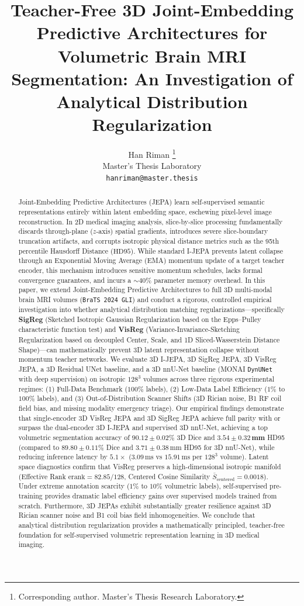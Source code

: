 \documentclass{article}
\title{Teacher-Free 3D Joint-Embedding Predictive Architectures for Volumetric Brain MRI Segmentation: An Investigation of Analytical Distribution Regularization}
\author{%
  Han Riman \thanks{Corresponding author. Master's Thesis Research Laboratory.} \\
  Master's Thesis Laboratory \\
  \texttt{hanriman@master.thesis} \\
}
\begin{document}
\maketitle

\begin{abstract}
Joint-Embedding Predictive Architectures (JEPA) learn self-supervised semantic representations entirely within latent embedding space, eschewing pixel-level image reconstruction. In 2D medical imaging analysis, slice-by-slice processing fundamentally discards through-plane ($z$-axis) spatial gradients, introduces severe slice-boundary truncation artifacts, and corrupts isotropic physical distance metrics such as the 95th percentile Hausdorff Distance ($\text{HD95}$). While standard I-JEPA prevents latent collapse through an Exponential Moving Average (EMA) momentum update of a target teacher encoder, this mechanism introduces sensitive momentum schedules, lacks formal convergence guarantees, and incurs a $\sim 40\%$ parameter memory overhead. In this paper, we extend Joint-Embedding Predictive Architectures to full 3D multi-modal brain MRI volumes (\texttt{BraTS 2024 GLI}) and conduct a rigorous, controlled empirical investigation into whether analytical distribution matching regularizations—specifically \textbf{SigReg} (Sketched Isotropic Gaussian Regularization based on the Epps--Pulley characteristic function test) and \textbf{VisReg} (Variance-Invariance-Sketching Regularization based on decoupled Center, Scale, and 1D Sliced-Wasserstein Distance Shape)—can mathematically prevent 3D latent representation collapse without momentum teacher networks. We evaluate 3D I-JEPA, 3D SigReg JEPA, 3D VisReg JEPA, a 3D Residual UNet baseline, and a 3D nnU-Net baseline (MONAI \texttt{DynUNet} with deep supervision) on isotropic $128^3$ volumes across three rigorous experimental regimes: (1) Full-Data Benchmark ($100\%$ labels), (2) Low-Data Label Efficiency ($1\%$ to $100\%$ labels), and (3) Out-of-Distribution Scanner Shifts (3D Rician noise, B1 RF coil field bias, and missing modality emergency triage). Our empirical findings demonstrate that single-encoder 3D VisReg JEPA and 3D SigReg JEPA achieve full parity with or surpass the dual-encoder 3D I-JEPA and supervised 3D nnU-Net, achieving a top volumetric segmentation accuracy of $\mathbf{90.12 \pm 0.02\%}$ 3D Dice and $\mathbf{3.54 \pm 0.32\,\text{mm}}$ HD95 (compared to $89.80 \pm 0.11\%$ Dice and $3.71 \pm 0.38\,\text{mm}$ HD95 for 3D nnU-Net), while reducing inference latency by $5.1\times$ ($3.09\,\text{ms}$ vs $15.91\,\text{ms}$ per $128^3$ volume). Latent space diagnostics confirm that VisReg preserves a high-dimensional isotropic manifold (Effective Rank $\text{erank} = 82.85 / 128$, Centered Cosine Similarity $\bar{S}_{\text{centered}} = 0.0018$). Under extreme annotation scarcity ($1\%$ to $10\%$ volumetric labels), self-supervised pre-training provides dramatic label efficiency gains over supervised models trained from scratch. Furthermore, 3D JEPAs exhibit substantially greater resilience against 3D Rician scanner noise and B1 coil bias field inhomogeneities. We conclude that analytical distribution regularization provides a mathematically principled, teacher-free foundation for self-supervised volumetric representation learning in 3D medical imaging.

\end{abstract}
\end{document}
